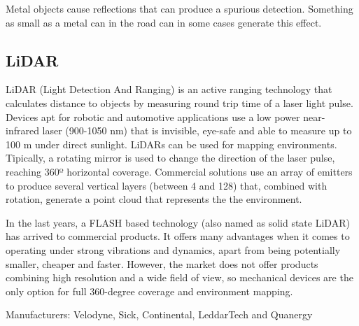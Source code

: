 Metal objects cause reflections that can produce a spurious detection. Something as small as a metal can in the road can in some cases generate this effect.

%  



\subsection{LiDAR}
LiDAR (Light Detection And Ranging) is an active ranging technology that calculates distance to objects by measuring round trip time of a laser light pulse.
Devices apt for robotic and automotive applications use a low power near-infrared laser (900-1050 nm) that is invisible, eye-safe and able to measure up to 100 m under direct sunlight.
LiDARs can be used for mapping environments. Tipically, a rotating mirror is used to change the direction of the laser pulse, reaching 360º horizontal coverage. Commercial solutions use an array of emitters to produce several vertical layers (between 4 and 128) that, combined with rotation, generate a point cloud that represents the the environment.

In the last years, a FLASH based technology (also named as solid state LiDAR) has arrived to commercial products. It offers many advantages when it comes to operating under strong vibrations and dynamics, apart from being potentially smaller, cheaper and faster.
However, the market does not offer products combining high resolution and a wide field of view, so mechanical devices are the only option for full 360-degree coverage and environment mapping.

Manufacturers: Velodyne, Sick, Continental, LeddarTech and Quanergy


